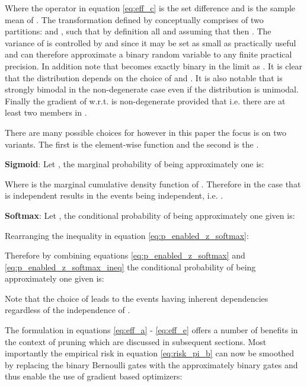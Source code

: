 \documentclass[final,1p,times]{elsarticle}
\begin{document}
Where the operator  in equation \eqref{eq:eff_c} is the set difference and  is the sample mean of . The transformation defined by  conceptually comprises  of two partitions:  and , such that by definition all  and assuming that  then . The variance of  is controlled by  and since  it may be set as small as practically useful and can therefore approximate a binary random variable to any finite practical precision. In addition note that  becomes exactly binary in the limit as .  It is clear that the distribution  depends on the choice of  and . It is also notable that  is strongly bimodal in the non-degenerate case even if the distribution  is unimodal. Finally the gradient of  w.r.t.  is non-degenerate provided that  i.e. there are at least two members in . \newline

There are many possible choices for  however in this paper the focus is on two variants. The first is the element-wise  function and the second is the . \newline

\textbf{Sigmoid}: Let , the marginal probability of  being approximately one is:



Where  is the marginal cumulative density function of . Therefore in the case that  is independent  results in the events  being independent, i.e. . \newline

\textbf{Softmax}: Let , the conditional probability of  being approximately one given  is:



Rearranging the inequality in equation \eqref{eq:p_enabled_z_softmax}:



Therefore by combining equations \eqref{eq:p_enabled_z_softmax} and \eqref{eq:p_enabled_z_softmax_ineq} the conditional probability of  being approximately one given  is:



Note that the choice of  leads to the events  having inherent dependencies regardless of the independence of . \newline

The formulation in equations \eqref{eq:eff_a} - \eqref{eq:eff_e} offers a number of benefits in the context of pruning which are discussed in subsequent sections. Most importantly the empirical risk in equation \eqref{eq:risk_pi_b} can now be smoothed by replacing the binary Bernoulli gates  with the approximately binary gates  and thus enable the use of gradient based optimizers:
\end{document}
